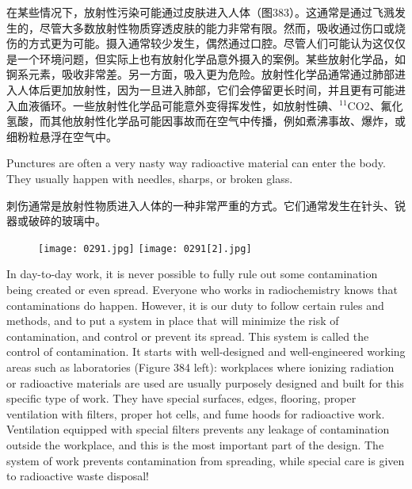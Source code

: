 \documentclass[dvipsnames, svgnames,a4paper,11pt]{article}
\begin{document}
在某些情况下，放射性污染可能通过皮肤进入人体（图383）。这通常是通过飞溅发生的，尽管大多数放射性物质穿透皮肤的能力非常有限。然而，吸收通过伤口或烧伤的方式更为可能。摄入通常较少发生，偶然通过口腔。尽管人们可能认为这仅仅是一个环境问题，但实际上也有放射化学品意外摄入的案例。某些放射化学品，如锕系元素，吸收非常差。另一方面，吸入更为危险。放射性化学品通常通过肺部进入人体后更加放射性，因为一旦进入肺部，它们会停留更长时间，并且更有可能进入血液循环。一些放射性化学品可能意外变得挥发性，如放射性碘、\(\mathrm{^{11}C}\)O2、氟化氢酸，而其他放射性化学品可能因事故而在空气中传播，例如煮沸事故、爆炸，或细粉粒悬浮在空气中。



Punctures are often a very nasty way radioactive material can enter the body. They usually happen with needles, sharps, or broken glass.

刺伤通常是放射性物质进入人体的一种非常严重的方式。它们通常发生在针头、锐器或破碎的玻璃中。

\begin{figure}[h]
    \centering
    \texttt{[image: 0291.jpg]} \hspace{0.2in}
    \texttt{[image: 0291[2].jpg]}  
     \label{fig384}
\end{figure}

In day-to-day work, it is never possible to fully rule out some contamination being created or even spread. Everyone who works in radiochemistry knows that contaminations do happen. However, it is our duty to follow certain rules and methods, and to put a system in place that will minimize the risk of contamination, and control or prevent its spread. This system is called the control of contamination. It starts with well-designed and well-engineered working areas such as laboratories (Figure 384 left): workplaces where ionizing radiation or radioactive materials are used are usually purposely designed and built for this specific type of work. They have special surfaces, edges, flooring, proper ventilation with filters, proper hot cells, and fume hoods for radioactive work. Ventilation equipped with special filters prevents any leakage of contamination outside the workplace, and this is the most important part of the design. The system of work prevents contamination from spreading, while special care is given to radioactive waste disposal!
\end{document}
